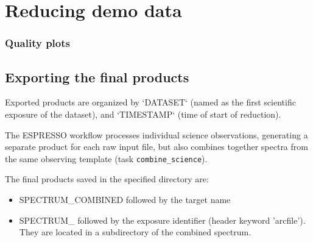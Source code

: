 
\section{Reducing demo data}
\label{sec:reducing_demo_data}



 
\subsubsection{Quality plots}


\subsection{Exporting the final products}
\label{sec:export_final_products}



 
 
Exported products are organized by `DATASET` (named as the first
scientific exposure of the dataset), and `TIMESTAMP` (time of start of
reduction).

The ESPRESSO workflow processes individual science observations, generating a separate product for each raw input file, but also combines together spectra from the same observing template (task {\tt combine\_science}).

The final products saved in the specified directory are: 


\begin{itemize}
\item SPECTRUM\_COMBINED followed by the target name
\item SPECTRUM\_ followed by the exposure identifier (header keyword 'arcfile'). They are located in a subdirectory of the combined spectrum.
\end{itemize}
